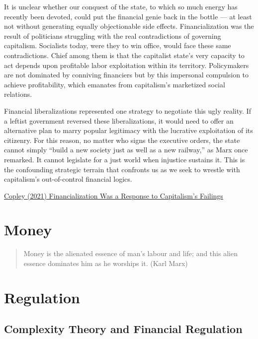 \documentclass[
]{book}
\begin{document}
It is unclear whether our conquest of the state, to which so much energy has recently been devoted, could put the financial genie back in the bottle --- at least not without generating equally objectionable side effects. Financialization was the result of politicians struggling with the real contradictions of governing capitalism. Socialists today, were they to win office, would face these same contradictions. Chief among them is that the capitalist state's very capacity to act depends upon profitable labor exploitation within its territory. Policymakers are not dominated by conniving financiers but by this impersonal compulsion to achieve profitability, which emanates from capitalism's marketized social relations.

Financial liberalizations represented one strategy to negotiate this ugly reality. If a leftist government reversed these liberalizations, it would need to offer an alternative plan to marry popular legitimacy with the lucrative exploitation of its citizenry. For this reason, no matter who signs the executive orders, the state cannot simply ``build a new society just as well as a new railway,'' as Marx once remarked. It cannot legislate for a just world when injustice sustains it. This is the confounding strategic terrain that confronts us as we seek to wrestle with capitalism's out-of-control financial logics.

\href{https://jacobinmag.com/2021/12/financialization-city-london-margaret-thatcher-england}{Copley (2021) Financialization Was a Response to Capitalism's Failings}

\hypertarget{money-1}{%
\chapter{Money}\label{money-1}}

\begin{quote}
Money is the alienated essence of man's labour and life; and this alien essence dominates him as he worships it. (Karl Marx)
\end{quote}

\hypertarget{regulation}{%
\chapter{Regulation}\label{regulation}}

\hypertarget{complexity-theory-and-financial-regulation}{%
\section{Complexity Theory and Financial Regulation}\label{complexity-theory-and-financial-regulation}}
\end{document}
